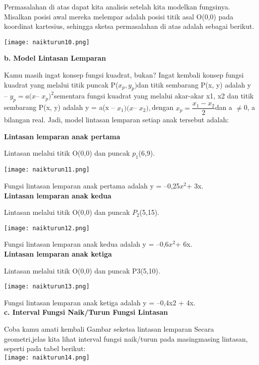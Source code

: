 \documentclass[11pt,fleqn]{book} %
\begin{document}
Permasalahan di atas dapat kita analisis setelah kita modelkan fungsinya. Misalkan posisi awal mereka melempar adalah posisi titik asal O(0,0) pada koordinat kartesius, sehingga sketsa permasalahan di atas adalah sebagai berikut.

\begin{center}
\texttt{[image: naikturun10.png]}
\end{center}

\textbf{b. Model Lintasan Lemparan}

Kamu masih ingat konsep fungsi kuadrat, bukan? Ingat
kembali konsep fungsi kuadrat yang melalui titik puncak
P($x_{p}, y_{p}) $dan titik sembarang P(x, y) adalah y – $y_{p} = a(x
$– $x_{p})^2 $sementara fungsi kuadrat yang melalui akar-akar x1,
x2 dan titik sembarang P(x, y) adalah y = a(x – $x_{1})(x $– $x_{2}),
$dengan $x_{p}= \dfrac{x_{1}-x_{2}}{2}
$dan a $\neq $0, a bilangan real. Jadi, model
lintasan lemparan setiap anak tersebut adalah:

\textbf{Lintasan lemparan anak pertama}

Lintasan melalui titik O(0,0) dan puncak $p_{1}$(6,9).

\texttt{[image: naikturun11.png]}

Fungsi lintasan lemparan anak pertama adalah y = –0,25$x^{2} $+ 3x.\\

\textbf{Lintasan lemparan anak kedua}

Lintasan melalui titik O(0,0) dan puncak $P_{2}$(5,15).

\texttt{[image: naikturun12.png]}

Fungsi lintasan lemparan anak kedua adalah y = –0,6$x^{2} $+ 6x.\\

\textbf{Lintasan lemparan anak ketiga}

Lintasan melalui titik O(0,0) dan puncak P3(5,10).

\texttt{[image: naikturun13.png]}

Fungsi lintasan lemparan anak ketiga adalah y = –0,4x2 +
4x.\\

\textbf{c. Interval Fungsi Naik/Turun Fungsi Lintasan}

Coba kamu amati kembali Gambar seketsa lintasan lemparan Secara geometri,jelas kita lihat interval fungsi naik/turun pada masingmasing lintasan, seperti pada tabel berikut:\\

\texttt{[image: naikturun14.png]}\\
\end{document}
